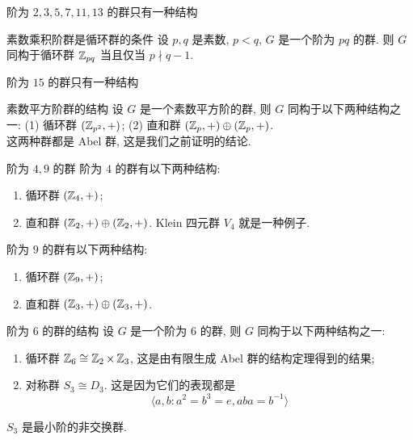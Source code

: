             \begin{ins}
                {阶为 \(2, 3, 5, 7, 11, 13\) 的群只有一种结构}
            \end{ins}

            \begin{thm}
                {素数乘积阶群是循环群的条件}
                设 \(p,q\) 是素数, \(p<q\), \(G\) 是一个阶为 \(pq\) 的群. 则 \(G\) 同构于循环群 \(\operatorname{\mathbb{Z}}_{pq}\) 当且仅当 \(p\nmid q-1\).
            \end{thm}

            \begin{ins}
                {阶为 \(15\) 的群只有一种结构}
            \end{ins}

            \begin{thm}
                {素数平方阶群的结构}
                设 \(G\) 是一个素数平方阶的群, 则 \(G\) 同构于以下两种结构之一: (1) 循环群 \((\operatorname{\mathbb{Z}}_{p^2}, +)\); (2) 直和群 \((\operatorname{\mathbb{Z}}_p, +)\oplus (\operatorname{\mathbb{Z}}_p, +)\).\\
                这两种群都是 Abel 群, 这是我们之前证明的结论.
            \end{thm}

            \begin{ins}
                {阶为 \(4, 9\) 的群}
                阶为 \(4\) 的群有以下两种结构:
                \begin{enumerate}
                    \item 循环群 \((\operatorname{\mathbb{Z}}_4, +)\);
                    \item 直和群 \((\operatorname{\mathbb{Z}}_2, +)\oplus (\operatorname{\mathbb{Z}}_2, +)\). Klein 四元群 \(V_4\) 就是一种例子.
                \end{enumerate}
                阶为 \(9\) 的群有以下两种结构:
                \begin{enumerate}
                    \item 循环群 \((\operatorname{\mathbb{Z}}_9, +)\);
                    \item 直和群 \((\operatorname{\mathbb{Z}}_3, +)\oplus (\operatorname{\mathbb{Z}}_3, +)\).
                \end{enumerate}
            \end{ins}

            \begin{ins}
                {阶为 \(6\) 的群的结构}
                设 \(G\) 是一个阶为 \(6\) 的群, 则 \(G\) 同构于以下两种结构之一: 
                \begin{enumerate}
                    \item 循环群 \(\operatorname{\mathbb{Z}}_6\cong\operatorname{\mathbb{Z}}_2\times\operatorname{\mathbb{Z}}_3\), 这是由有限生成 Abel 群的结构定理得到的结果;
                    \item 对称群 \(S_3\cong D_3\). 这是因为它们的表现都是 \[\langle a,b: a^2=b^3=e, aba=b^{-1}\rangle\]
                \end{enumerate}
                \(S_3\) 是最小阶的非交换群.
            \end{ins}

